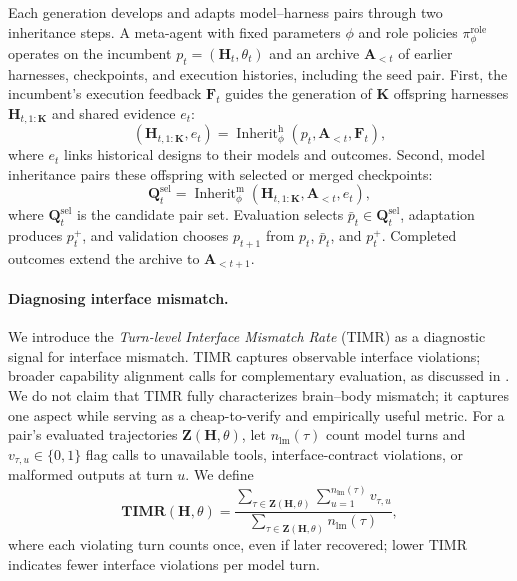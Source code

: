 \documentclass[11pt,a4paper]{article}
\begin{document}
Each generation develops and adapts model--harness pairs through two inheritance steps. A meta-agent with fixed parameters $\phi$ and role policies $\pi_\phi^{\mathrm{role}}$ operates on the incumbent $p_t=(\mathbf{H}_t,\theta_t)$ and an archive $\mathbf{A}_{<t}$ of earlier harnesses, checkpoints, and execution histories, including the seed pair. First, the incumbent's execution feedback $\mathbf{F}_t$ guides the generation of $\mathbf{K}$ offspring harnesses $\mathbf{H}_{t,1:\mathbf{K}}$ and shared evidence $e_t$:
\begin{equation}
(\mathbf{H}_{t,1:\mathbf{K}},e_t)
=\operatorname{Inherit}_{\phi}^{\mathrm{h}}(p_t,\mathbf{A}_{<t},\mathbf{F}_t),
\label{eq:overview-harness-inheritance}
\end{equation}
where $e_t$ links historical designs to their models and outcomes. Second, model inheritance pairs these offspring with selected or merged checkpoints:
\begin{equation}
\mathbf{Q}_t^{\mathrm{sel}}
=\operatorname{Inherit}_{\phi}^{\mathrm{m}}(\mathbf{H}_{t,1:\mathbf{K}},\mathbf{A}_{<t},e_t),
\label{eq:overview-model-inheritance}
\end{equation}
where $\mathbf{Q}_t^{\mathrm{sel}}$ is the candidate pair set. Evaluation selects $\bar p_t\in\mathbf{Q}_t^{\mathrm{sel}}$, adaptation produces $p_t^+$, and validation chooses $p_{t+1}$ from $p_t$, $\bar p_t$, and $p_t^+$. Completed outcomes extend the archive to $\mathbf{A}_{<t+1}$.

\paragraph{Diagnosing interface mismatch.}
We introduce the \emph{Turn-level Interface Mismatch Rate} (TIMR) as a diagnostic signal for interface mismatch.
TIMR captures observable interface violations; broader capability alignment calls for complementary evaluation, as discussed in .
We do not claim that TIMR fully characterizes brain--body mismatch; it captures one aspect while serving as a cheap-to-verify and empirically useful metric. For a pair's evaluated trajectories $\mathbf{Z}(\mathbf{H},\theta)$, let $n_{\mathrm{lm}}(\tau)$ count model turns and $v_{\tau,u}\in\{0,1\}$ flag calls to unavailable tools, interface-contract violations, or malformed outputs at turn $u$. We define
\begin{equation}
\mathbf{TIMR}(\mathbf{H},\theta)=
\frac{\sum_{\tau\in\mathbf{Z}(\mathbf{H},\theta)}\sum_{u=1}^{n_{\mathrm{lm}}(\tau)}v_{\tau,u}}
{\sum_{\tau\in\mathbf{Z}(\mathbf{H},\theta)}n_{\mathrm{lm}}(\tau)},
\label{eq:timr}
\end{equation}
where each violating turn counts once, even if later recovered; lower TIMR indicates fewer interface violations per model turn.
\end{document}

